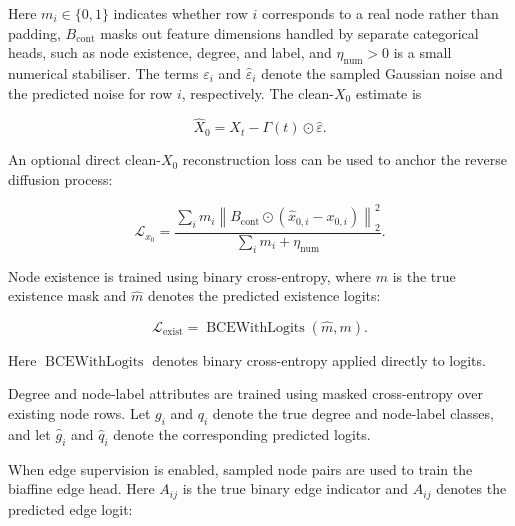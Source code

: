 Here \(m_i\in\{0,1\}\) indicates whether row \(i\) corresponds to a real node
rather than padding, \(B_{\mathrm{cont}}\) masks out feature dimensions handled
by separate categorical heads, such as node existence, degree, and label, and
\(\eta_{\mathrm{num}}>0\) is a small numerical stabiliser. The terms
\(\varepsilon_i\) and \(\hat{\varepsilon}_i\) denote the sampled Gaussian noise
and the predicted noise for row \(i\), respectively. The clean-\(X_0\) estimate is

\[
    \hat{X}_0 = X_t - \Gamma(t)\odot \hat{\varepsilon}.
\]

An optional direct clean-\(X_0\) reconstruction loss can be used to anchor the
reverse diffusion process:

\[
    \mathcal{L}_{x_0}
    =
    \frac{
        \sum_i m_i
        \left\|
            B_{\mathrm{cont}}
            \odot
            (\hat{x}_{0,i} - x_{0,i})
        \right\|_2^2
    }{
        \sum_i m_i + \eta_{\mathrm{num}}
    }.
\]

Node existence is trained using binary cross-entropy, where \(m\) is the true
existence mask and \(\hat m\) denotes the predicted existence logits:

\[
    \mathcal{L}_{\mathrm{exist}}
    =
    \operatorname{BCEWithLogits}(\hat{m}, m).
\]

Here \(\operatorname{BCEWithLogits}\) denotes binary cross-entropy applied
directly to logits.

Degree and node-label attributes are trained using masked cross-entropy over
existing node rows. Let \(g_i\) and \(q_i\) denote the true degree and
node-label classes, and let \(\hat g_i\) and \(\hat q_i\) denote the
corresponding predicted logits.

When edge supervision is enabled, sampled node pairs are used to train the
biaffine edge head. Here \(A_{ij}\) is the true binary edge indicator and
\(\hat A_{ij}\) denotes the predicted edge logit:

